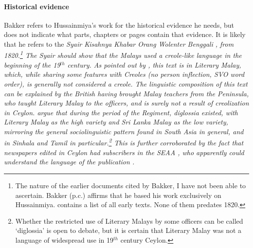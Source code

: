 \paragraph{Historical evidence}
Bakker refers to Hussainmiya's work for the historical evidence he needs, but does not indicate what parts, chapters or pages contain that evidence. It is likely that he refers to the \em Syair Kisahnya Khabar Orang Wolenter Benggali \em \citep[86]{Hussainmiya1987}, from 1820.\footnote{The nature of the earlier documents cited by Bakker, I have not been able to ascertain. Bakker (p.c.) affirms that he based his work exclusively on Hussainmiya. \citet[86ff]{Hussainmiya1987} contains a list of all early texts. None of them predates 1820.} The Syair should show that the Malays used a creole-like language in the beginning of the 19$^{th}$ century. As pointed out by \citet[178]{SmithEtAl2006cll}, this text is in Literary Malay, which, while sharing some features with Creoles (no person inflection, SVO word order), is generally not considered a creole. The linguistic composition of this text can be explained by the British having brought Malay teachers from the Peninsula, who taught Literary Malay to the officers, and is surely not a result of creolization in Ceylon.   \citet{SmithEtAl2006cll} argue that during the period of the Regiment, diglossia existed, with Literary Malay as the high variety and Sri Lanka Malay as the low variety, mirroring the general sociolinguistic pattern found in South Asia in general, and in Sinhala and Tamil in particular.\footnote{Whether
 the restricted use of Literary Malays by some officers can be called `diglossia' is open to debate, but it is certain that Literary Malay was not a language of widespread use in 19$^{th}$ century Ceylon.}
This is further corroborated by the fact that newspapers edited in Ceylon had subscribers in the SEAA \citep[89]{Hussainmiya1987}, who apparently could understand the language of the publication \citep[24]{Saldin2001}.

